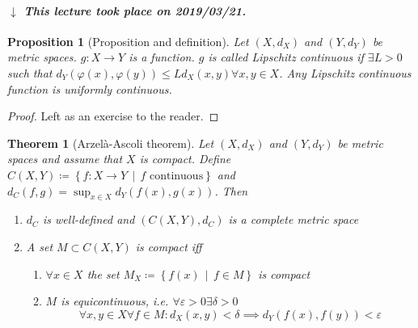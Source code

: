 \documentclass{article}
\newcounter{lecref}[section]
\numberwithin{lecref}{section}
\newtheorem{theorem}[lecref]{Theorem}
\newtheorem{proposition}[lecref]{Proposition}
\newcommand{\SetDef}[2]{\left\{#1\,\mid\,#2\right\}}
\newcommand{\dateref}[1]{%
  \begin{mdframed}[backgroundcolor=gray!10,innerbottommargin=0pt,innertopmargin=0pt]
    \paragraph{\textit{$\downarrow$ This lecture took place on #1.}}%
  \end{mdframed}%
}
\begin{document}
\dateref{2019/03/21}

\begin{proposition}[Proposition and definition]
	\label{proposition:1.21}
	Let $(X, d_X)$ and $(Y, d_Y)$ be metric spaces.
	$g: X \to Y$ is a function. $g$ is called \emph{Lipschitz continuous}
	if $\exists L > 0$ such that $d_Y(\varphi(x), \varphi(y)) \leq L d_X(x, y) \forall x, y \in X$.
	Any Lipschitz continuous function is uniformly continuous.
\end{proposition}

\begin{proof}
	Left as an exercise to the reader.
\end{proof}

\begin{theorem}[Arzelà-Ascoli theorem]
	\label{theorem:1.22}
	Let $(X, d_X)$ and $(Y, d_Y)$ be metric spaces and assume that $X$ is compact.
	Define $C(X, Y) \coloneqq \SetDef{f: X \to Y}{f \text{ continuous}}$ and $d_C(f, g) = \sup_{x \in X} d_Y(f(x), g(x))$.
	Then
	\begin{enumerate}
		\item $d_C$ is well-defined and $(C(X, Y), d_C)$ is a complete metric space
		\item A set $M \subset C(X, Y)$ is compact iff
			\begin{enumerate}
				\item $\forall x \in X$ the set $M_X \coloneqq \SetDef{f(x)}{f \in M}$ is compact
				\item $M$ is \emph{equicontinuous}, i.e. $\forall \varepsilon > 0 \exists \delta > 0$
					\[ \forall x, y \in X \forall f \in M: d_X(x, y) < \delta \implies d_Y(f(x), f(y)) < \varepsilon \]
			\end{enumerate}
	\end{enumerate}
\end{theorem}
\end{document}
